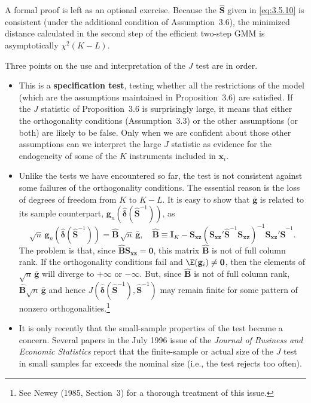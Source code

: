 A formal proof is left as an optional exercise.  Because the $\hat{\mathbf{S}}$ given in
\eqref{eq:3.5.10} is consistent (under the additional condition of Assumption~3.6), the
minimized distance calculated in the second step of the efficient two-step GMM is
asymptotically $\chi^2(K - L)$.

Three points on the use and interpretation of the $J$ test are in order.

\begin{itemize}
\item This is a \textbf{specification test}, testing whether all the restrictions of the model
  (which are the assumptions maintained in Proposition~3.6) are satisfied.  If the $J$
  statistic of Proposition~3.6 is surprisingly large, it means that either the orthogonality
  conditions (Assumption~3.3) or the other assumptions (or both) are likely
  to be false.  Only when we are confident about those other assumptions can we
  interpret the large $J$ statistic as evidence for the endogeneity of some of the $K$
  instruments included in $\mathbf{x}_i$.

\item Unlike the tests we have encountered so far, the test is not consistent against
  some failures of the orthogonality conditions.  The essential reason is the loss of
  degrees of freedom from $K$ to $K - L$.  It is easy to show that $\bar{\mathbf{g}}$ is related to its
  sample counterpart, $\mathbf{g}_n(\hat{\boldsymbol{\delta}}(\hat{\mathbf{S}}^{-1}))$, as
  \begin{equation}
    \sqrt{n}\, \mathbf{g}_n(\hat{\boldsymbol{\delta}}(\hat{\mathbf{S}}^{-1}))
    = \hat{\mathbf{B}}\, \sqrt{n}\, \bar{\mathbf{g}}, \quad
    \hat{\mathbf{B}} \equiv \mathbf{I}_K
    - \mathbf{S}_{\mathbf{xz}}
      (\mathbf{S}_{\mathbf{xz}}' \hat{\mathbf{S}}^{-1} \mathbf{S}_{\mathbf{xz}})^{-1}
      \mathbf{S}_{\mathbf{xz}}' \hat{\mathbf{S}}^{-1}.
    \label{eq:3.6.2}
  \end{equation}
  The problem is that, since
  $\hat{\mathbf{B}} \mathbf{S}_{\mathbf{xz}} = \mathbf{0}$, this matrix $\hat{\mathbf{B}}$ is not of full
  column rank.  If the orthogonality conditions fail and $\E(\mathbf{g}_i) \neq \mathbf{0}$, then the
  elements of $\sqrt{n}\, \bar{\mathbf{g}}$ will diverge to $+\infty$ or $-\infty$.  But, since
  $\hat{\mathbf{B}}$ is not of full column rank,
  $\hat{\mathbf{B}} \sqrt{n}\, \bar{\mathbf{g}}$ and hence
  $J(\hat{\boldsymbol{\delta}}(\hat{\mathbf{S}}^{-1}), \hat{\mathbf{S}}^{-1})$ may remain finite
  for some pattern of nonzero orthogonalities.\footnote{See Newey (1985, Section~3) for a
  thorough treatment of this issue.}

\item It is only recently that the small-sample properties of the test became a concern.
  Several papers in the July 1996 issue of the \emph{Journal of Business and Economic
  Statistics} report that the finite-sample or actual size of the $J$ test in small samples
  far exceeds the nominal size (i.e., the test rejects too often).
\end{itemize}

